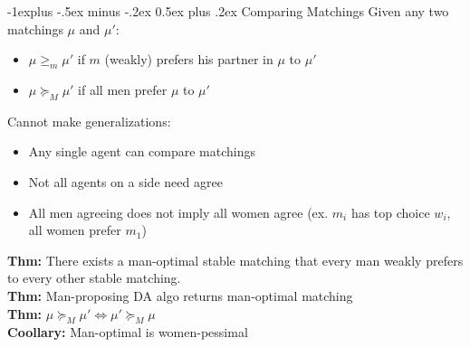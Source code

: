 \documentclass[10pt,landscape]{article}
\makeatletter
\renewcommand{\subsection}{\@startsection{subsection}{2}{0mm}%
                                {-1explus -.5ex minus -.2ex}%
                                {0.5ex plus .2ex}%
                                {\normalfont\normalsize\bfseries}}
\makeatother
\begin{document}
\begin{multicols*}{3}
\subsection{Comparing Matchings}
Given any two matchings $\mu$ and $\mu'$:
\begin{itemize}
\item $\mu \geq_m \mu'$ if $m$ (weakly) prefers his partner in $\mu$ to $\mu'$
\item $\mu \succeq_M \mu'$ if all men prefer $\mu$ to $\mu'$
\end{itemize}
Cannot make generalizations:
\begin{itemize}
\item Any single agent can compare matchings
\item Not all agents on a side need agree
\item All men agreeing does not imply all women agree (ex. $m_i$ has top choice $w_i$, all women prefer $m_1$)
\end{itemize}
\textbf{Thm:} There exists a man-optimal stable matching that every man weakly prefers to every other stable matching.\\
\textbf{Thm:} Man-proposing DA algo returns man-optimal matching\\
\textbf{Thm:} $\mu \succeq_M \mu' \iff \mu' \succeq_M \mu$\\
\textbf{Coollary:} Man-optimal is women-pessimal

\end{multicols*}
\end{document}
